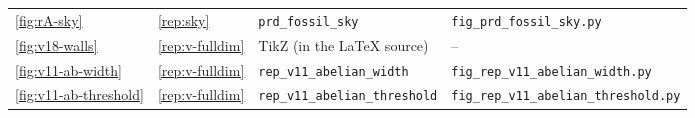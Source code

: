 {\begin{longtable}{@{}>{\raggedright\arraybackslash}p{}>{\raggedright\arraybackslash}p{}>{\raggedright\arraybackslash}p{}>{\raggedright\arraybackslash}p{}@{}}
\ref{fig:rA-sky} & \ref{rep:sky} & \texttt{prd\_\allowbreak{}fossil\_\allowbreak{}sky} & \texttt{fig\_\allowbreak{}prd\_\allowbreak{}fossil\_\allowbreak{}sky.py} \\
\ref{fig:v18-walls} & \ref{rep:v-fulldim} & TikZ (in the LaTeX source) & -- \\
\ref{fig:v11-ab-width} & \ref{rep:v-fulldim} & \texttt{rep\_\allowbreak{}v11\_\allowbreak{}abelian\_\allowbreak{}width} & \texttt{fig\_\allowbreak{}rep\_\allowbreak{}v11\_\allowbreak{}abelian\_\allowbreak{}width.py} \\
\ref{fig:v11-ab-threshold} & \ref{rep:v-fulldim} & \texttt{rep\_\allowbreak{}v11\_\allowbreak{}abelian\_\allowbreak{}threshold} & \texttt{fig\_\allowbreak{}rep\_\allowbreak{}v11\_\allowbreak{}abelian\_\allowbreak{}threshold.py} \\
\end{longtable}}
